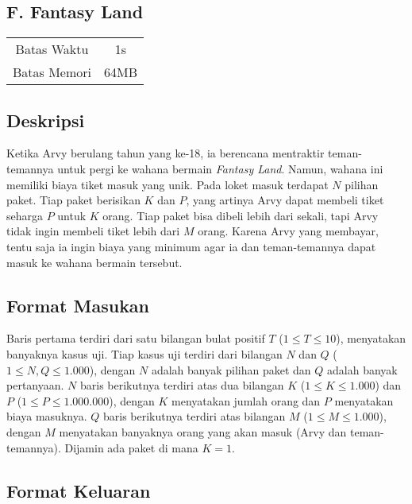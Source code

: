 \documentclass{article}
\begin{document}
\begin{center}
    \section*{F. Fantasy Land}

    \begin{tabular}{ | c c | }
        \hline
        Batas Waktu  & 1s \\
        Batas Memori & 64MB \\
        \hline
    \end{tabular}
\end{center}

\subsection*{Deskripsi}

Ketika Arvy berulang tahun yang ke-18, ia berencana mentraktir teman-temannya untuk pergi ke wahana bermain \textit{Fantasy Land}.
Namun, wahana ini memiliki biaya tiket masuk yang unik.
Pada loket masuk terdapat $N$ pilihan paket.
Tiap paket berisikan $K$ dan $P$, yang artinya Arvy dapat membeli tiket seharga $P$ untuk $K$ orang.
Tiap paket bisa dibeli lebih dari sekali, tapi Arvy tidak ingin membeli tiket lebih dari $M$ orang.
Karena Arvy yang membayar, tentu saja ia ingin biaya yang minimum agar ia dan teman-temannya dapat masuk ke wahana bermain tersebut.


\subsection*{Format Masukan}

Baris pertama terdiri dari satu bilangan bulat positif $T$ ($1 \leq T \leq 10$), menyatakan banyaknya kasus uji.
Tiap kasus uji terdiri dari bilangan $N$ dan $Q$ ($1 \leq N, Q \leq 1.000$), dengan $N$ adalah banyak pilihan paket dan $Q$ adalah banyak pertanyaan.
$N$ baris berikutnya terdiri atas dua bilangan $K$ ($1 \leq K \leq 1.000$) dan $P$ ($1 \leq P \leq 1.000.000$), dengan $K$ menyatakan jumlah orang dan $P$ menyatakan biaya masuknya.
$Q$ baris berikutnya terdiri atas bilangan $M$ ($1 \leq M \leq 1.000$), dengan $M$ menyatakan banyaknya orang yang akan masuk (Arvy dan teman-temannya).
Dijamin ada paket di mana $K = 1$.

\subsection*{Format Keluaran}
\end{document}
